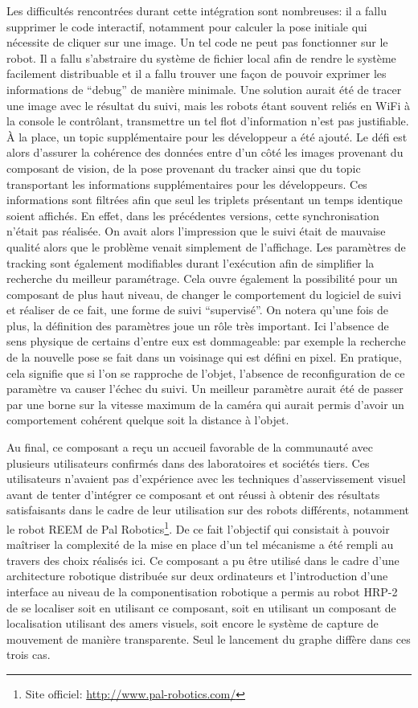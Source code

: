 Les difficultés rencontrées durant cette intégration sont nombreuses:
il a fallu supprimer le code interactif, notamment pour calculer la
pose initiale qui nécessite de cliquer sur une image. Un tel code ne
peut pas fonctionner sur le robot. Il a fallu s'abstraire du système
de fichier local afin de rendre le système facilement distribuable et
il a fallu trouver une façon de pouvoir exprimer les informations de
``debug'' de manière minimale. Une solution aurait été de tracer une
image avec le résultat du suivi, mais les robots étant souvent reliés
en WiFi à la console le contrôlant, transmettre un tel flot
d'information n'est pas justifiable. À la place, un topic
supplémentaire pour les développeur a été ajouté. Le défi est alors
d'assurer la cohérence des données entre d'un côté les images
provenant du composant de vision, de la pose provenant du tracker
ainsi que du topic transportant les informations supplémentaires pour
les développeurs. Ces informations sont filtrées afin que seul les
triplets présentant un temps identique soient affichés. En effet, dans
les précédentes versions, cette synchronisation n'était pas
réalisée. On avait alors l'impression que le suivi était de mauvaise
qualité alors que le problème venait simplement de l'affichage. Les
paramètres de tracking sont également modifiables durant l'exécution
afin de simplifier la recherche du meilleur paramétrage. Cela ouvre
également la possibilité pour un composant de plus haut niveau, de
changer le comportement du logiciel de suivi et réaliser de ce fait,
une forme de suivi ``supervisé''. On notera qu'une fois de plus, la
définition des paramètres joue un rôle très important. Ici l'absence
de sens physique de certains d'entre eux est dommageable: par exemple
la recherche de la nouvelle pose se fait dans un voisinage qui est
défini en pixel. En pratique, cela signifie que si l'on se rapproche
de l'objet, l'absence de reconfiguration de ce paramètre va causer
l'échec du suivi. Un meilleur paramètre aurait été de passer par une
borne sur la vitesse maximum de la caméra qui aurait permis d'avoir un
comportement cohérent quelque soit la distance à l'objet.


Au final, ce composant a reçu un accueil favorable de la communauté
avec plusieurs utilisateurs confirmés dans des laboratoires et
sociétés tiers. Ces utilisateurs n'avaient pas d'expérience avec les
techniques d'asservissement visuel avant de tenter d'intégrer ce
composant et ont réussi à obtenir des résultats satisfaisants dans le
cadre de leur utilisation sur des robots différents, notamment le robot
REEM de Pal Robotics\footnote{Site officiel:
  \url{http://www.pal-robotics.com/}}. De ce fait l'objectif qui
consistait à pouvoir maîtriser la complexité de la mise en place d'un
tel mécanisme a été rempli au travers des choix réalisés ici. Ce
composant a pu être utilisé dans le cadre d'une architecture robotique
distribuée sur deux ordinateurs et l'introduction d'une interface au
niveau de la componentisation robotique a permis au robot HRP-2 de se
localiser soit en utilisant ce composant, soit en utilisant un
composant de localisation utilisant des amers visuels, soit encore
le système de capture de mouvement de manière transparente. Seul le
lancement du graphe diffère dans ces trois cas.


